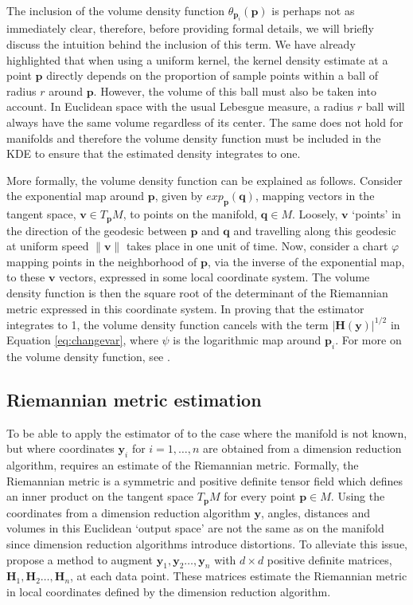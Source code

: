 \documentclass[11pt,a4paper,]{article}
\begin{document}
The inclusion of the volume density function \(\theta_{\pmb{p}_i}(\pmb{p})\) is perhaps not as immediately clear, therefore, before providing formal details, we will briefly discuss the intuition behind the inclusion of this term. We have already highlighted that when using a uniform kernel, the kernel density estimate at a point \(\pmb{p}\) directly depends on the proportion of sample points within a ball of radius \(r\) around \(\pmb{p}\). However, the volume of this ball must also be taken into account. In Euclidean space with the usual Lebesgue measure, a radius \(r\) ball will always have the same volume regardless of its center. The same does not hold for manifolds and therefore the volume density function must be included in the KDE to ensure that the estimated density integrates to one.

More formally, the volume density function can be explained as follows. Consider the exponential map around \(\pmb{p}\), given by \(exp_{\pmb{p}}(\pmb{q})\), mapping vectors in the tangent space, \(\pmb{v}\in T_{\pmb{p}}M\), to points on the manifold, \(\pmb{q}\in M\). Loosely, \(\pmb{v}\) `points' in the direction of the geodesic between \(\pmb{p}\) and \(\pmb{q}\) and travelling along this geodesic at uniform speed \(\|\pmb{v}\|\) takes place in one unit of time. Now, consider a chart \(\varphi\) mapping points in the neighborhood of \(\pmb{p}\), via the inverse of the exponential map, to these \(\pmb{v}\) vectors, expressed in some local coordinate system. The volume density function is then the square root of the determinant of the Riemannian metric expressed in this coordinate system. In proving that the estimator integrates to 1, the volume density function cancels with the term \(|\pmb{H}(\pmb{y})|^{1/2}\) in Equation \eqref{eq:changevar}, where \(\psi\) is the logarithmic map around \(\pmb{p}_i\). For more on the volume density function, see \textcite{Le_Brigant2019-lj}.

\hypertarget{MetLearn}{%
\subsection{Riemannian metric estimation}\label{MetLearn}}

To be able to apply the estimator of \textcite{Pelletier2005-vu} to the case where the manifold is not known, but where coordinates \(\pmb{y}_i\) for \(i=1,\dots,n\) are obtained from a dimension reduction algorithm, requires an estimate of the Riemannian metric. Formally, the Riemannian metric is a symmetric and positive definite tensor field which defines an inner product on the tangent space \(T_{\pmb{p}} M\) for every point \(\pmb{p} \in M\). Using the coordinates from a dimension reduction algorithm \(\pmb{y}\), angles, distances and volumes in this Euclidean `output space' are not the same as on the manifold since dimension reduction algorithms introduce distortions. To alleviate this issue, \textcite{Perrault-Joncas2013-pq} propose a method to augment \(\pmb{y}_1,\pmb{y}_2\dots,\pmb{y}_n\) with \(d\times d\) positive definite matrices, \(\pmb{H}_1,\pmb{H}_2\dots,\pmb{H}_n\), at each data point. These matrices estimate the Riemannian metric in local coordinates defined by the dimension reduction algorithm.
\end{document}
